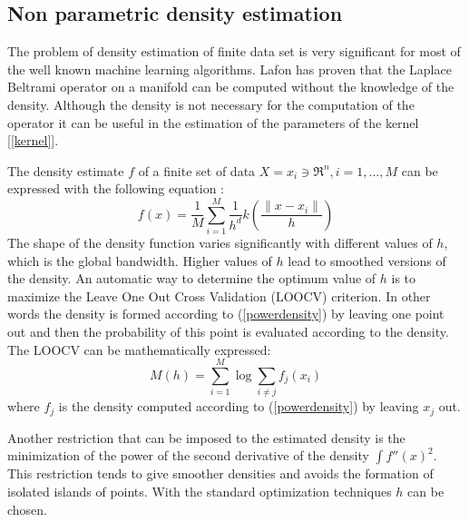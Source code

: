 \documentclass[12pt,letterpaper,doublespaced,ETD,dvips,proposal]{gtthesis}
\begin{document}
\begin{Body}
\section{Non parametric  density estimation}
The problem of density estimation of finite data set is very
significant for most of the well known machine learning algorithms.
Lafon has proven that the Laplace Beltrami operator on a manifold
can be computed without the knowledge of the density. Although the
density is not necessary for the computation of the operator it can
be useful in the estimation of the parameters of the kernel
[\ref{kernel}].

The  density estimate $f$ of a finite set of data $X={x_i\ni
\Re^n,i=1,\dots,M}$ can be expressed with the following equation
\cite{Silverman}:
\begin{equation}\label{powerdensity}
    f(x)=\frac{1}{M}\sum_{i=1}^{M}\frac{1}{h^d}k\left(\frac{\parallel x-x_i
\parallel}{h}\right)
\end{equation}
The shape of the density function varies significantly with
different values of $h$, which is the global bandwidth. Higher
values of $h$ lead to smoothed versions of the  density. An
automatic way to determine the optimum value of $h$ is to maximize
the Leave One Out Cross Validation (LOOCV) criterion. In other words
the density is formed according to (\ref{powerdensity}) by leaving
one point out and then the probability of this point is evaluated
according to the density. The LOOCV can be mathematically expressed:
\begin{equation}
    M(h)=\sum_{i=1}^{M}\log\sum_{i\neq j}f_j(x_i)
\end{equation}
where $f_j$ is the density computed according to
(\ref{powerdensity}) by leaving $x_j$ out.

Another restriction that can be imposed to the estimated density is
the minimization of the power of the second derivative of the
density $\int f''(x)^2$. This restriction tends to give smoother
densities and avoids the formation of isolated islands of points.
With the standard optimization techniques $h$ can be chosen.


\end{Body}
\end{document}
